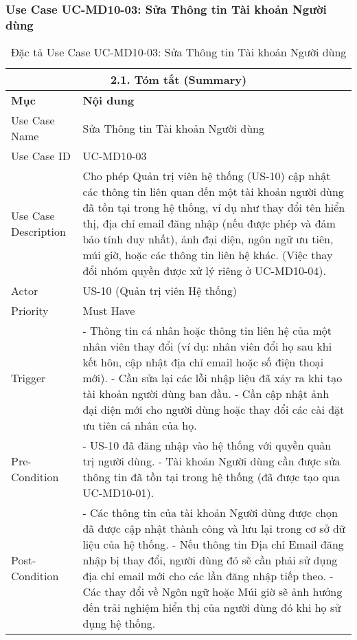 \subsubsection{Use Case UC-MD10-03: Sửa Thông tin Tài khoản Người dùng}
\begin{longtable}{|m{4cm}|p{11cm}|}
\caption{Đặc tả Use Case UC-MD10-03: Sửa Thông tin Tài khoản Người dùng} \label{tab:uc_md10_03_full_v2_latex_fixed_in_codeblock} \\
\hline
\multicolumn{2}{|c|}{\textbf{2.1. Tóm tắt (Summary)}} \\
\hline
\textbf{Mục} & \textbf{Nội dung} \\
\hline
\endhead %
\midrule
\endfoot %
\bottomrule
\endlastfoot %
Use Case Name & Sửa Thông tin Tài khoản Người dùng \\
\hline
Use Case ID & UC-MD10-03 \\
\hline
Use Case Description & Cho phép Quản trị viên hệ thống (US-10) cập nhật các thông tin liên quan đến một tài khoản người dùng đã tồn tại trong hệ thống, ví dụ như thay đổi tên hiển thị, địa chỉ email đăng nhập (nếu được phép và đảm bảo tính duy nhất), ảnh đại diện, ngôn ngữ ưu tiên, múi giờ, hoặc các thông tin liên hệ khác. (Việc thay đổi nhóm quyền được xử lý riêng ở UC-MD10-04). \\
\hline
Actor & US-10 (Quản trị viên Hệ thống) \\
\hline
Priority & Must Have \\
\hline
Trigger & - Thông tin cá nhân hoặc thông tin liên hệ của một nhân viên thay đổi (ví dụ: nhân viên đổi họ sau khi kết hôn, cập nhật địa chỉ email hoặc số điện thoại mới). \newline - Cần sửa lại các lỗi nhập liệu đã xảy ra khi tạo tài khoản người dùng ban đầu. \newline - Cần cập nhật ảnh đại diện mới cho người dùng hoặc thay đổi các cài đặt ưu tiên cá nhân của họ. \\
\hline
Pre-Condition & - US-10 đã đăng nhập vào hệ thống với quyền quản trị người dùng. \newline - Tài khoản Người dùng cần được sửa thông tin đã tồn tại trong hệ thống (đã được tạo qua UC-MD10-01). \\
\hline
Post-Condition & - Các thông tin của tài khoản Người dùng được chọn đã được cập nhật thành công và lưu lại trong cơ sở dữ liệu của hệ thống. \newline - Nếu thông tin Địa chỉ Email đăng nhập bị thay đổi, người dùng đó sẽ cần phải sử dụng địa chỉ email mới cho các lần đăng nhập tiếp theo. \newline - Các thay đổi về Ngôn ngữ hoặc Múi giờ sẽ ảnh hưởng đến trải nghiệm hiển thị của người dùng đó khi họ sử dụng hệ thống. \\

\end{longtable}

